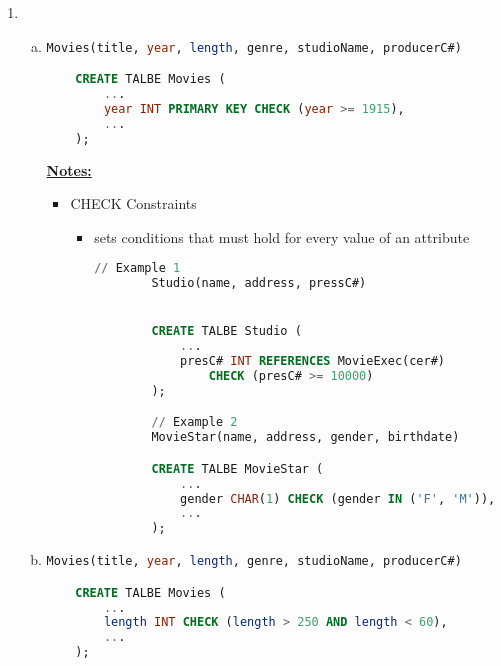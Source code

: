 \documentclass[12pt]{article}
\begin{document}
\begin{enumerate}[1.]
\begin{enumerate}[a)]
    \end{enumerate}

    \item

    \begin{enumerate}[a)]
        \item

    \begin{lstlisting}[language=SQL]
    Movies(title, year, length, genre, studioName, producerC#)

    CREATE TALBE Movies (
        ...
        year INT PRIMARY KEY CHECK (year >= 1915),
        ...
    );
    \end{lstlisting}

        \bigskip

        \underline{\textbf{Notes:}}

        \bigskip

        \begin{itemize}
            \item CHECK Constraints
            \begin{itemize}
                \item sets conditions that must hold for every value of an attribute

        \begin{lstlisting}[language=SQL]
        // Example 1
        Studio(name, address, pressC#)


        CREATE TALBE Studio (
            ...
            presC# INT REFERENCES MovieExec(cer#)
                CHECK (presC# >= 10000)
        );

        // Example 2
        MovieStar(name, address, gender, birthdate)

        CREATE TALBE MovieStar (
            ...
            gender CHAR(1) CHECK (gender IN ('F', 'M')),
            ...
        );
        \end{lstlisting}
            \end{itemize}
        \end{itemize}

        \item

    \begin{lstlisting}[language=SQL]
    Movies(title, year, length, genre, studioName, producerC#)

    CREATE TALBE Movies (
        ...
        length INT CHECK (length > 250 AND length < 60),
        ...
    );
    \end{lstlisting}


\end{enumerate}
\end{enumerate}
\end{document}
